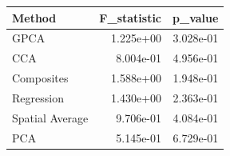 \begin{tabular}{lrr}
\toprule
Method & F_statistic & p_value \\
\midrule
GPCA & 1.225e+00 & 3.028e-01 \\
CCA & 8.004e-01 & 4.956e-01 \\
Composites & 1.588e+00 & 1.948e-01 \\
Regression & 1.430e+00 & 2.363e-01 \\
Spatial Average & 9.706e-01 & 4.084e-01 \\
PCA & 5.145e-01 & 6.729e-01 \\
\bottomrule
\end{tabular}
